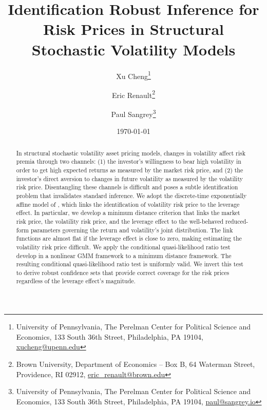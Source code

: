 \documentclass[11pt, letterpaper, twoside]{article}
\author{Xu Cheng\thanks{University of Pennsylvania, The Perelman Center for Political Science and Economics, 133 South 36th Street, Philadelphia, PA 19104, \href{mailto:xucheng@upenn.edu}{xucheng@upenn.edu}} \and Eric Renault\thanks{Brown University, Department of Economics -- Box B, 64 Waterman Street, Providence, RI 02912, \href{mailto:eric_renault@brown.edu}{eric\_renault@brown.edu}} \and Paul Sangrey\thanks{University of Pennsylvania, The Perelman Center for Political Science and Economics, 133 South 36th Street, Philadelphia, PA 19104, \href{mailto:paul@sangrey.io}{paul@sangrey.io}}}
\title{Identification Robust Inference for Risk Prices in Structural Stochastic Volatility Models}
\date{\today}
\begin{document}
\begin{titlepage}


\maketitle
\thispagestyle{empty}
\addtocounter{page}{-1}

\begin{abstract} 

\singlespacing \noindent 
In structural stochastic volatility asset pricing models, changes in volatility affect risk premia through two channels: (1) the investor's willingness to bear high volatility in order to get high expected returns as measured by the market risk price, and (2) the investor’s direct aversion to changes in future volatility as measured by the volatility risk price. Disentangling these channels is difficult and poses a subtle identification problem that invalidates standard inference. We adopt the discrete-time exponentially affine model of \textcite{han2018leverage}, which links the identification of volatility risk price to the leverage effect. In particular, we develop a minimum distance criterion that links the market risk price, the volatility risk price, and the leverage effect to the well-behaved reduced-form parameters governing the return and volatility's joint distribution. The link functions are almost flat if the leverage effect is close to zero, making estimating the volatility risk price difficult. We apply the conditional quasi-likelihood ratio test \textcite{andrews2016conditional} develop in a nonlinear GMM framework to a minimum distance framework. The resulting conditional quasi-likelihood ratio test is uniformly valid. We invert this test to derive robust confidence sets that provide correct coverage for the risk prices regardless of the leverage effect's magnitude. 

\end{abstract} 

\vspace{\baselineskip}


\vspace{\baselineskip}


\end{titlepage}
\end{document}
